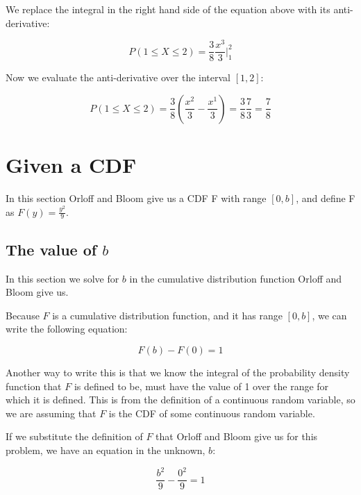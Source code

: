 \documentclass[a4paper,11pt]{article}
\begin{document}
We replace the integral in the right hand side of the equation above with its
anti-derivative:

\begin{equation}
P \left( 1 \leq X \leq 2 \right) = \frac{3}{8} \frac{x^{3}}{3} \bigg\rvert_{1}^{2}
\end{equation}

Now we evaluate the anti-derivative over the interval $\left[ 1, 2 \right]$:

\begin{equation}
P \left( 1 \leq X \leq 2 \right)
  = \frac{3}{8} \left( \frac{x^{2}}{3} - \frac{x^{1}}{3} \right)
  = \frac{3}{8} \frac{7}{3}
  = \frac{7}{8}
\end{equation}

\section{Given a CDF}

In this section Orloff and Bloom give us a CDF F with range
$\left[ 0, b \right]$, and define F as $F\left( y \right) = \frac{y^{2}}{9}$.

\subsection{The value of $b$}

In this section we solve for $b$ in the cumulative distribution function Orloff
and Bloom give us.

Because $F$ is a cumulative distribution function, and it has range
$\left[ 0, b \right]$, we can write the following equation:

\begin{equation}
    F \left(b \right) - F\left(0 \right) = 1
\end{equation}

Another way to write this is that we know the integral of the probability
density function that $F$ is defined to be, must have the value of 1 over
the range for which it is defined.  This is from the definition of a continuous
random variable, so we are assuming that $F$ is the CDF of some continuous
random variable.

If we substitute the definition of $F$ that Orloff and Bloom give us for this
problem, we have an equation in the unknown, $b$:

\begin{equation}
  \frac{b^{2}}{9} - \frac{0^{2}}{9} = 1
\end{equation}
\end{document}
